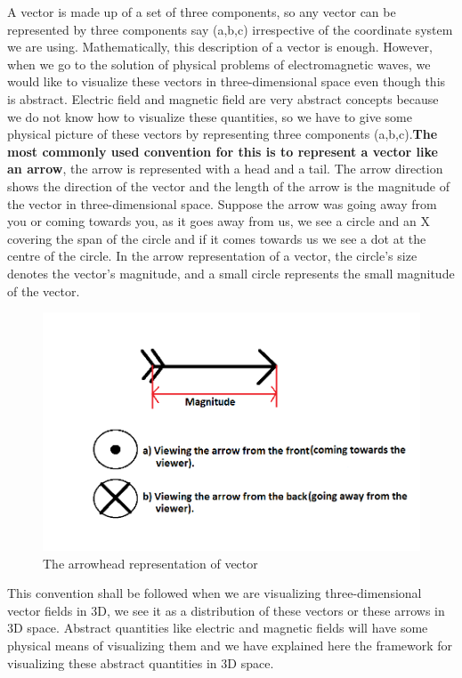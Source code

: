 A vector is made up of a set of three components, so any vector can be represented by three components say (a,b,c) irrespective of the coordinate system we are using. Mathematically, this description of a vector is enough. However, when we go to the solution of physical problems of electromagnetic waves, we would like to visualize these vectors in three-dimensional space even though this is abstract. Electric field and magnetic field are very abstract concepts because we do not know how to visualize these quantities, so we have to give some physical picture of these vectors by representing three components (a,b,c).\textbf{The most commonly used convention for this is to represent a vector like an arrow}, the arrow is represented with a head and a tail. The arrow direction shows the direction of the vector and the length of the arrow is the magnitude of the vector in three-dimensional space. Suppose the arrow was going away from you or coming towards you, as it goes away from us, we see a circle and an \textgravedbl X \textacutedbl covering the span of the circle and if it comes towards us we see a dot at the centre of the circle. In the arrow representation of a vector, the circle's size denotes the vector's magnitude, and a small circle represents the small magnitude of the vector.
\begin{figure}[h]
\centering
\includegraphics[width=1\linewidth]{graphics/arrowhead}
\caption{The arrowhead representation of vector}
\end{figure}

This convention shall be followed when we are visualizing three-dimensional vector fields in 3D, we see it as a distribution of these vectors or these arrows in 3D space. Abstract quantities like electric and magnetic fields will have some physical means of visualizing them and we have explained here the framework for visualizing these abstract quantities in 3D space.  

